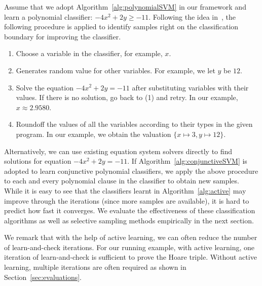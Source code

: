 Assume that we adopt Algorithm~\ref{alg:polynomialSVM} in our framework and learn a polynomial classifier: $\mathit{-4x^2+2y \geq -11}$.
Following the idea in~\cite{DBLP:conf/icml/OrabonaC11}, the following procedure is applied to identify samples right on the classification boundary for improving the classifier.
\begin{enumerate}
\item Choose a variable in the classifier, for example, $x$.
\item Generates random value for other variables. For example, we let $y$ be $12$.
\item Solve the equation $\mathit{-4x^2+2y = -11}$ after substituting variables with their values. If there is no solution, go back to (1) and retry.
In our example, $\mathit{x \approx 2.9580}$.
\item Roundoff the values of all the variables according to their types in the given program. In our example, we obtain the valuation $\mathit{\{x \mapsto 3, y \mapsto 12\}}$.
\end{enumerate}
Alternatively, we can use existing equation system solvers directly to find solutions for equation $\mathit{-4x^2+2y = -11}$.
If Algorithm~\ref{alg:conjunctiveSVM} is adopted to learn conjunctive polynomial classifiers, we apply the above procedure to each and every polynomial clause in the classifier to obtain new samples.
While it is easy to see that the classifiers learnt in Algorithm~\ref{alg:active} may improve through the iterations (since more samples are available),
it is hard to predict how fast it converges.
We evaluate the effectiveness of these classification algorithms as well as selective sampling methods empirically in the next section.

We remark that with the help of active learning, we can often reduce the number of learn-and-check iterations. %
For our running example, with active learning, one iteration of learn-and-check is sufficient to prove the Hoare triple.
Without active learning, multiple iterations are often required as shown in Section~\ref{sec:evaluations}.
